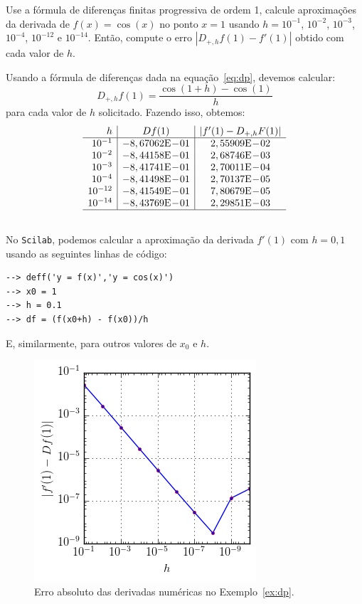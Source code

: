 \begin{ex}\label{ex:dp}
Use a fórmula de diferenças finitas progressiva de ordem 1, calcule aproximações da derivada de $f(x)=\cos(x)$ no ponto $x=1$ usando $h=10^{-1}$, $10^{-2}$, $10^{-3}$, $10^{-4}$, $10^{-12}$ e $10^{-14}$. Então, compute o erro $|D_{+,h}f(1)-f'(1)|$ obtido com cada valor de $h$.
\end{ex}
\begin{sol}
Usando a fórmula de diferenças dada na equação~\eqref{eq:dp}, devemos calcular:
\begin{equation*}
  D_{+,h}f(1) = \frac{\cos(1 + h) - \cos(1)}{h}
\end{equation*}
para cada valor de $h$ solicitado. Fazendo isso, obtemos:
\begin{equation*}
  \begin{array}{r|c|c}
    h & Df(1) & |f'(1) - D_{+,h}F(1)| \\ \hline
    10^{-1} & -8,67062\E-01 & 2,55909\E-02\\
    10^{-2} & -8,44158\E-01 & 2,68746\E-03\\
    10^{-3} & -8,41741\E-01 & 2,70011\E-04\\
    10^{-4} & -8,41498\E-01 & 2,70137\E-05 \\
    10^{-12} & -8,41549\E-01 & 7,80679\E-05\\
    10^{-14} & -8,43769\E-01 & 2,29851\E-03 \\\hline
    \multicolumn{3}{c}{}
  \end{array}
\end{equation*}

\ifisscilab
No \verb+Scilab+, podemos calcular a aproximação da derivada $f'(1)$ com $h=0,1$ usando as seguintes linhas de código:
\begin{verbatim}
--> deff('y = f(x)','y = cos(x)')
--> x0 = 1
--> h = 0.1
--> df = (f(x0+h) - f(x0))/h
\end{verbatim}
E, similarmente, para outros valores de $x_0$ e $h$.
\fi
\end{sol}

\begin{figure}
  \centering
  \includegraphics{./cap_derivacao/pics/ex_derivacao/ex_derivacao}
  \caption{Erro absoluto das derivadas numéricas no Exemplo~\ref{ex:dp}.}
  \label{fig:ex_derivacao}
\end{figure}

